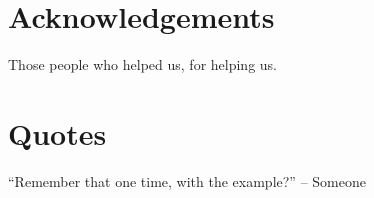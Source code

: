 \documentclass[sheet]{testgame}
\begin{document}
\section*{Acknowledgements}

\begin{itemz}

  \item Those people who helped us, for helping us.

\end{itemz}


\section*{Quotes}

\begin{itemz}

  \item ``Remember that one time, with the example?'' -- Someone

\end{itemz}
\end{document}
